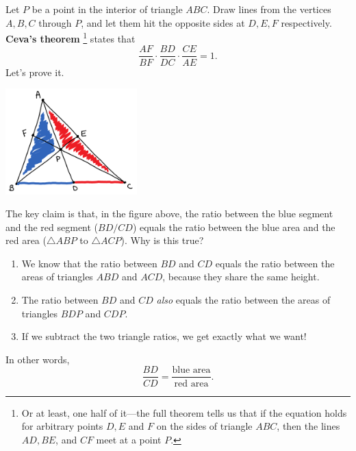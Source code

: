 \documentclass{article}
\begin{document}
Let $P$ be a point in the interior of triangle $ABC$. Draw lines from the vertices $A, B, C$ through $P$, and let them hit the opposite sides at $D, E, F$ respectively. \textbf{Ceva's theorem} \footnote{Or at least, one half of it—the full theorem tells us that if the equation holds for arbitrary points $D, E$ and $F$ on the sides of triangle $ABC$, then the lines $AD, BE$, and $CF$ meet at a point $P$.} states that
$$\dfrac{AF}{BF} \cdot \dfrac{BD}{DC} \cdot \dfrac{CE}{AE} = 1.$$
Let's prove it.
\begin{center}
    \centering
    \includegraphics[width=2in]{images/triangle_areas/part_2/ceva_fig1.png}
\end{center}
The key claim is that, in the figure above, the ratio between the blue segment and the red segment ($BD/CD$) equals the ratio between the blue area and the red area ($\triangle ABP$ to $\triangle ACP$). Why is this true?
\begin{enumerate}
    \item We know that the ratio between $BD$ and $CD$ equals the ratio between the areas of triangles $ABD$ and $ACD$, because they share the same height.
    \item The ratio between $BD$ and $CD$ \textit{also} equals the ratio between the areas of triangles $BDP$ and $CDP$.
    \item If we subtract the two triangle ratios, we get exactly what we want!
\end{enumerate}

In other words,
$$\frac{BD}{CD} = \frac{\text{blue area}}{\text{red area}}.$$
\end{document}
